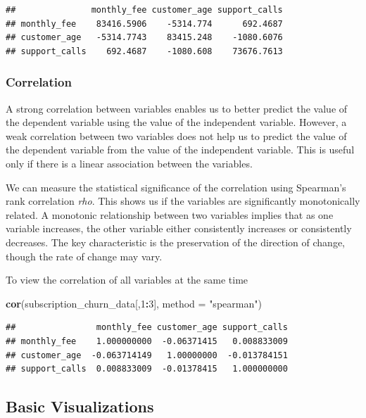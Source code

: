 \documentclass[
]{article}
\newenvironment{Shaded}{\begin{snugshade}}{\end{snugshade}}
\newcommand{\AttributeTok}[1]{\textcolor[rgb]{0.13,0.29,0.53}{#1}}
\newcommand{\DecValTok}[1]{\textcolor[rgb]{0.00,0.00,0.81}{#1}}
\newcommand{\FunctionTok}[1]{\textcolor[rgb]{0.13,0.29,0.53}{\textbf{#1}}}
\newcommand{\NormalTok}[1]{#1}
\newcommand{\SpecialCharTok}[1]{\textcolor[rgb]{0.81,0.36,0.00}{\textbf{#1}}}
\newcommand{\StringTok}[1]{\textcolor[rgb]{0.31,0.60,0.02}{#1}}
\begin{document}
\begin{verbatim}
##               monthly_fee customer_age support_calls
## monthly_fee    83416.5906    -5314.774      692.4687
## customer_age   -5314.7743    83415.248    -1080.6076
## support_calls    692.4687    -1080.608    73676.7613
\end{verbatim}

\subsubsection{Correlation}\label{correlation}

A strong correlation between variables enables us to better predict the
value of the dependent variable using the value of the independent
variable. However, a weak correlation between two variables does not
help us to predict the value of the dependent variable from the value of
the independent variable. This is useful only if there is a linear
association between the variables.

We can measure the statistical significance of the correlation using
Spearman's rank correlation \emph{rho}. This shows us if the variables
are significantly monotonically related. A monotonic relationship
between two variables implies that as one variable increases, the other
variable either consistently increases or consistently decreases. The
key characteristic is the preservation of the direction of change,
though the rate of change may vary.

To view the correlation of all variables at the same time

\begin{Shaded}
\begin{Highlighting}[]
\FunctionTok{cor}\NormalTok{(subscription\_churn\_data[,}\DecValTok{1}\SpecialCharTok{:}\DecValTok{3}\NormalTok{], }\AttributeTok{method =} \StringTok{"spearman"}\NormalTok{)}
\end{Highlighting}
\end{Shaded}

\begin{verbatim}
##                monthly_fee customer_age support_calls
## monthly_fee    1.000000000  -0.06371415   0.008833009
## customer_age  -0.063714149   1.00000000  -0.013784151
## support_calls  0.008833009  -0.01378415   1.000000000
\end{verbatim}

\subsection{Basic Visualizations}\label{basic-visualizations}
\end{document}
